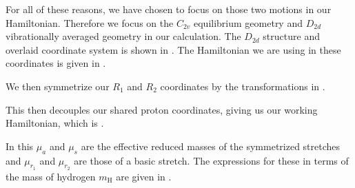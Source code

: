 % 
% 

 For all of these reasons, we have chosen to focus on those two motions in our Hamiltonian. Therefore we focus on the $C_{2v}$ equilibrium geometry and $D_{2d}$ vibrationally averaged geometry in our calculation. The $D_{2d}$ structure and overlaid coordinate system is shown in . The Hamiltonian we are using in these coordinates is given in .


We then symmetrize our $R_1$ and $R_2$ coordinates by the transformations in .


This then decouples our shared proton coordinates, giving us our working Hamiltonian, which is .


In this $\mu_{a}$ and $\mu_{s}$ are the effective reduced masses of the symmetrized stretches and $\mu_{r_1}$ and $\mu_{r_2}$ are those of a basic \htwo{} stretch. The expressions for these in terms of the mass of hydrogen $m_{\mathrm{H}}$ are given in .


% 
